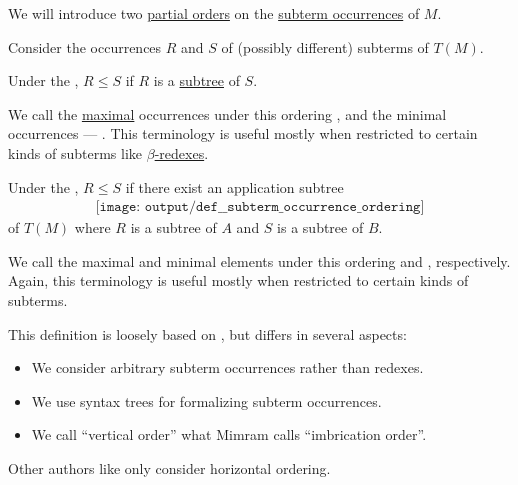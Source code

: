 \begin{definition}\label{def:subterm_occurrence_ordering}\mimprovised
  We will introduce two \hyperref[def:partially_ordered_set]{partial orders} on the \hyperref[def:lambda_subterm_occurrence]{subterm occurrences} of \( M \).

  Consider the occurrences \( R \) and \( S \) of (possibly different) subterms of \( T(M) \).

  \begin{thmenum}
     Under the , \( R \leq S \) if \( R \) is a \hyperref[def:tree/subtree]{subtree} of \( S \).

    We call the \hyperref[def:extremal_points/maximal_and_minimal_element]{maximal} occurrences under this ordering , and the minimal occurrences --- . This terminology is useful mostly when restricted to certain kinds of subterms like \hyperref[def:beta_eta_reduction]{\( \beta \)-redexes}.

     Under the , \( R \leq S \) if there exist an application subtree
    \begin{equation*}
      \begin{aligned}
        \texttt{[image: output/def\_\_subterm\_occurrence\_ordering]}
      \end{aligned}
    \end{equation*}
    of \( T(M) \) where \( R \) is a subtree of \( A \) and \( S \) is a subtree of \( B \).

    We call the maximal and minimal elements under this ordering  and , respectively. Again, this terminology is useful mostly when restricted to certain kinds of subterms.
  \end{thmenum}
\end{definition}
\begin{comments}
  \item This definition is loosely based on \cite[138]{Mimram2020ProgramEqualsProof}, but differs in several aspects:
  \begin{itemize}
    \item We consider arbitrary subterm occurrences rather than redexes.
    \item We use syntax trees for formalizing subterm occurrences.
    \item We call \enquote{vertical order} what Mimram calls \enquote{imbrication order}.
  \end{itemize}

  Other authors like  only consider horizontal ordering.
\end{comments}

